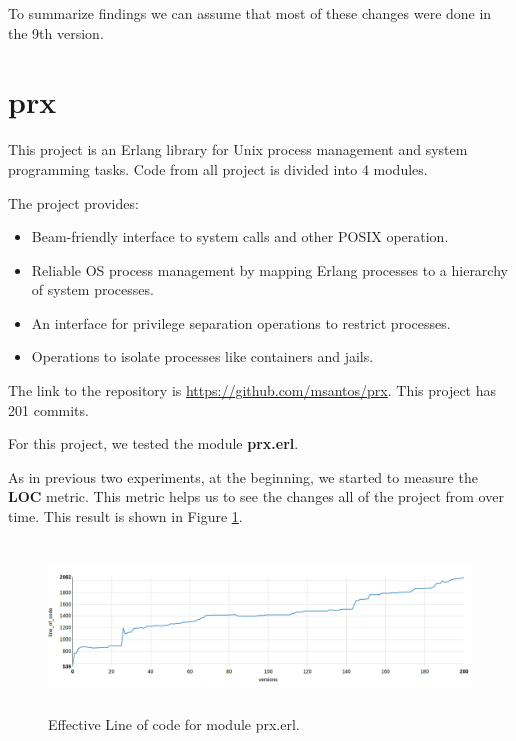 To summarize findings we can assume that most of these changes were done in the 9th version.


\section{prx}

This project is an Erlang library for Unix process management and system programming tasks. Code from all project is divided into 4 modules. 

The project provides:

\begin{itemize}
	\item Beam-friendly interface to system calls and other POSIX operation.
	\item Reliable OS process management by mapping Erlang processes to a hierarchy of system processes.
	\item An interface for privilege separation operations to restrict processes.
	\item Operations to isolate processes like containers and jails.
\end{itemize}


The link to the repository is \url{https://github.com/msantos/prx}. This project has 201 commits. 

For this project, we tested the module \textbf{prx.erl}. 

As in previous two experiments, at the beginning, we started to measure the \textbf{LOC} metric. This metric helps us to see the changes all of the project from over time. This result is shown in Figure \ref{fig:line_of_code_prx}.

\begin{figure}[h]
	\centering
	\includegraphics[height=45mm]{figures/line_of_code_prx.png}
	\caption{Effective Line of code for module prx.erl.}
	\label{fig:line_of_code_prx}
\end{figure}

